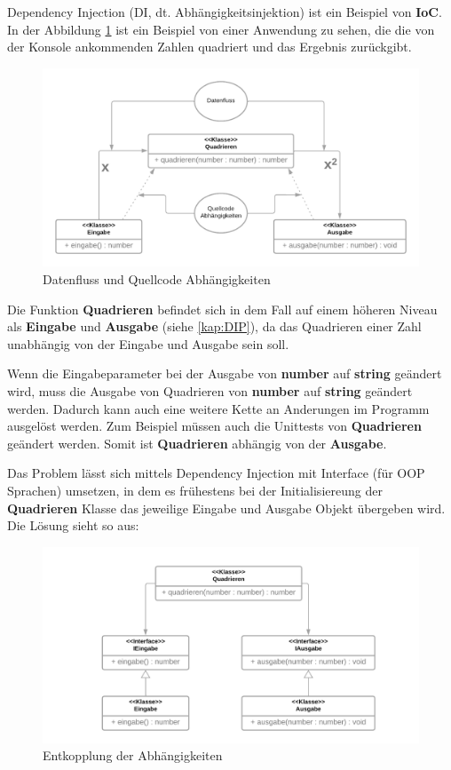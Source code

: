 Dependency Injection (DI, dt. Abhängigkeitsinjektion) ist ein Beispiel von \textbf{IoC}.
In der Abbildung \ref{fig:dateflowVScodedep} ist ein Beispiel von einer Anwendung zu sehen, die die von der Konsole ankommenden Zahlen quadriert und das Ergebnis zurückgibt.
                
\begin{figure}[H]
    \centering
    \includegraphics[width=1\textwidth]{./images/DepInj_1.png}
    \caption{Datenfluss und Quellcode Abhängigkeiten}
    \label{fig:dateflowVScodedep}
\end{figure}

Die Funktion \textbf{Quadrieren} befindet sich in dem Fall auf einem höheren 
Niveau als \textbf{Eingabe} und \textbf{Ausgabe} (siehe \ref{kap:DIP}), 
da das Quadrieren einer Zahl unabhängig von der Eingabe und Ausgabe sein soll.

Wenn die Eingabeparameter bei der Ausgabe von \textbf{number} auf \textbf{string} geändert wird, 
muss die Ausgabe von Quadrieren von \textbf{number} auf \textbf{string} geändert werden.
Dadurch kann auch eine weitere Kette an Anderungen im Programm ausgelöst werden. 
Zum Beispiel müssen auch die Unittests von \textbf{Quadrieren} geändert werden.
Somit ist \textbf{Quadrieren} abhängig von der \textbf{Ausgabe}.

Das Problem lässt sich mittels Dependency Injection 
mit Interface (für OOP Sprachen) umsetzen, 
in dem es frühestens bei der Initialisiereung der \textbf{Quadrieren} 
Klasse das jeweilige Eingabe und Ausgabe Objekt übergeben wird.
Die Lösung sieht so aus: 
\begin{figure}[H]
    \centering
    \includegraphics[width=1\textwidth]{./images/DepInj_2.png}
    \caption{Entkopplung der Abhängigkeiten}
    \label{fig:strukturGoodDI}
\end{figure}

